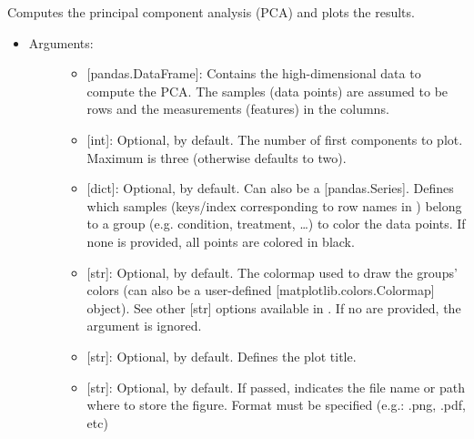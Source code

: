 \documentclass[letterpaper,10pt,english]{sphinxmanual}
\begin{document}
\begin{fulllineitems}
\label{\detokenize{plots:data_tools.plots.pca}}
Computes the principal component analysis (PCA) and plots the
results.
\begin{itemize}
\item {} \begin{description}
\item[{Arguments:}] \leavevmode\begin{itemize}
\item {} 
 {[}pandas.DataFrame{]}: Contains the high-dimensional data
to compute the PCA. The samples (data points) are assumed to
be rows and the measurements (features) in the columns.

\item {} 
 {[}int{]}: Optional,  by default. The number of
first components to plot. Maximum is three (otherwise defaults
to two).

\item {} 
 {[}dict{]}: Optional,  by default. Can also be a
{[}pandas.Series{]}. Defines which samples (keys/index
corresponding to row names in ) belong to a group (e.g.
condition, treatment, …) to color the data points. If none
is provided, all points are colored in black.

\item {} 
 {[}str{]}: Optional,  by default. The colormap
used to draw the groups’ colors (can also be a user-defined
{[}matplotlib.colors.Colormap{]} object). See other {[}str{]} options
available in . If no 
are provided, the argument is ignored.

\item {} 
 {[}str{]}: Optional,  by default. Defines the plot
title.

\item {} 
 {[}str{]}: Optional,  by default. If passed,
indicates the file name or path where to store the figure.
Format must be specified (e.g.: .png, .pdf, etc)


\end{itemize}
\end{description}
\end{itemize}
\end{fulllineitems}
\end{document}
